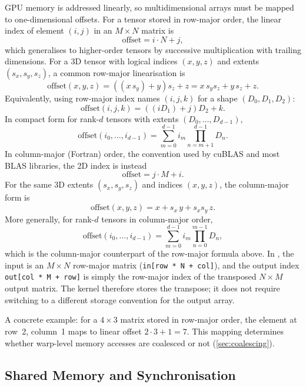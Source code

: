 GPU memory is addressed linearly, so multidimensional arrays must be mapped to one-dimensional offsets. For a tensor stored in row-major order, the linear index of element $(i, j)$ in an $M \times N$ matrix is
\begin{equation}\label{eq:row-major}
  \text{offset} = i \cdot N + j,
\end{equation}
which generalises to higher-order tensors by successive multiplication with trailing dimensions. For a 3D tensor with logical indices $(x,y,z)$ and extents $(s_x,s_y,s_z)$, a common row-major linearisation is
\begin{equation}\label{eq:row-major-3d}
  \text{offset}(x,y,z)=((x\,s_y)+y)s_z+z=x\,s_y s_z+y\,s_z+z.
\end{equation}
Equivalently, using row-major index names $(i,j,k)$ for a shape $(D_0,D_1,D_2)$:
\[
  \text{offset}(i,j,k)=((iD_1)+j)D_2+k.
\]
In compact form for rank-$d$ tensors with extents $(D_0,\dots,D_{d-1})$,
\[
  \text{offset}(i_0,\dots,i_{d-1})=
  \sum_{m=0}^{d-1}
  i_m \prod_{n=m+1}^{d-1} D_n.
\]
In column-major (Fortran) order, the convention used by cuBLAS and most BLAS libraries, the 2D index is instead
\begin{equation}\label{eq:col-major}
  \text{offset} = j \cdot M + i.
\end{equation}
For the same 3D extents $(s_x,s_y,s_z)$ and indices $(x,y,z)$, the column-major form is
\[
  \text{offset}(x,y,z)=x+s_x\,y+s_x s_y\,z.
\]
More generally, for rank-$d$ tensors in column-major order,
\[
  \text{offset}(i_0,\dots,i_{d-1})=
  \sum_{m=0}^{d-1}
  i_m \prod_{n=0}^{m-1} D_n,
\]
which is the column-major counterpart of the row-major formula above. In
, the input is an $M \times N$ row-major matrix
(\texttt{in[row * N + col]}), and the output index
\texttt{out[col * M + row]} is simply the row-major index of the transposed
$N \times M$ output matrix. The kernel therefore stores the transpose; it does
not require switching to a different storage convention for the output array.

A concrete example: for a $4 \times 3$ matrix stored in row-major order, the element at row~2, column~1 maps to linear offset $2 \cdot 3 + 1 = 7$. This mapping determines whether warp-level memory accesses are coalesced or not (\cref{sec:coalescing}).

\subsection{Shared Memory and Synchronisation}\label{sec:shared-memory}

